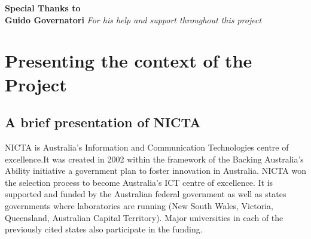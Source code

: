 \documentclass[10pt]{article}
\begin{document}
\newpage
\restoregeometry
\renewcommand{\thesection}{\Roman{section}} 

\renewcommand{\abstractname}{Executive Summary}
\begin{abstract}
\lipsum[1-2]
\end{abstract}


\newpage

\begin{center}
\begin{minipage}{.8\textwidth}
\textbf{\large Special Thanks to}\\
\textbf{Guido Governatori} \textit{For his help and support throughout this project}
\end{minipage}
\end{center}

\newpage

\tableofcontents
\newpage
{}
\setcounter{page}{1}
\pagestyle{fancy}
\renewcommand{\sectionmark}[1]{\markright{\thesection.\ #1}}
\fancyhead{}
\fancyhead[R]{\slshape \rightmark}
\fancyfoot{}
\fancyfoot[C]{\thepage}
\renewcommand{\headrulewidth}{0.4pt}
\renewcommand{\footrulewidth}{0 pt}

\section{Presenting the context of the Project}
\subsection{A brief presentation of NICTA}
NICTA is Australia's Information and Communication Technologies centre of excellence.\footnotemark It was created in 2002 within the framework of the Backing Australia's Ability initiative a government plan to foster innovation in Australia. NICTA won the selection process to become Australia's ICT centre of excellence. It is supported and funded by the Australian federal government as well as states governments where laboratories are running (New South Wales, Victoria, Queensland, Australian Capital Territory). Major universities in each of the previously cited states also participate in the funding.\\

\end{document}
